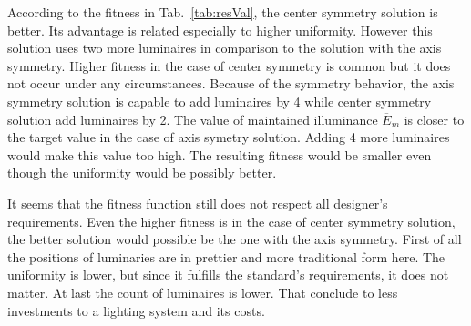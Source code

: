 According to the fitness in Tab.~\ref{tab:resVal}, the center symmetry solution is better. Its advantage is related especially to higher uniformity. However this solution uses two more luminaires in comparison to the solution with the axis symmetry. Higher fitness in the case of center symmetry is common but it does not occur under any circumstances. Because of the symmetry behavior, the axis symmetry solution is capable to add luminaires by 4 while center symmetry solution add luminaires by 2. The value of maintained illuminance $\overline{E}_{m}$ is closer to the target value in the case of axis symetry solution. Adding 4 more luminaires would make this value too high. The resulting fitness would be smaller even though the uniformity would be possibly better.

It seems that the fitness function still does not respect all designer's requirements. Even the higher fitness is in the case of center symmetry solution, the better solution would possible be the one with the axis symmetry. First of all the positions of luminaries are in prettier and more traditional form here. The uniformity is lower, but since it fulfills the standard's requirements, it does not matter. At last the count of luminaires is lower. That conclude to less investments to a lighting system and its costs.

